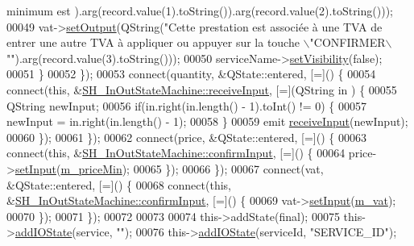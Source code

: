 \begin{DoxyCode}
{{       minimum est %
      ).arg(record.value(1).toString()).arg(record.value(2).toString()));
00049             vat->\hyperlink{classSH__DatabaseContentQuestionState_aaec6c7f8bc78c6beb7447fc41ffe3875}{setOutput}(QString(\textcolor{stringliteral}{"Cette prestation est associée à une TVA de %
       entrer une autre TVA à appliquer ou appuyer sur la touche \(\backslash\)"CONFIRMER\(\backslash\)""}).arg(record.value(3).toString()));
00050             serviceName->\hyperlink{classSH__InOutState_a7fdfaa6f600f0ac4a96f238a038ba9ad}{setVisibility}(\textcolor{keyword}{false});
00051         \}
00052     \});
00053     connect(quantity, &QState::entered, [=]() \{
00054         connect(\textcolor{keyword}{this}, &\hyperlink{classSH__InOutStateMachine_a037ed5e13ecfae2123a8d4940292e410}{SH\_InOutStateMachine::receiveInput}, [=](QString in
      ) \{
00055             QString newInput;
00056             \textcolor{keywordflow}{if}(in.right(in.length() - 1).toInt() != 0) \{
00057                 newInput = in.right(in.length() - 1);
00058             \}
00059             emit \hyperlink{classSH__InOutStateMachine_a037ed5e13ecfae2123a8d4940292e410}{receiveInput}(newInput);
00060         \});
00061     \});
00062     connect(price, &QState::entered, [=]() \{
00063         connect(\textcolor{keyword}{this}, &\hyperlink{classSH__InOutStateMachine_a7f7d9c9300c1d05bce2c26029f28cc31}{SH\_InOutStateMachine::confirmInput}, [=]() \{
00064             price->\hyperlink{classSH__QuestionState_ab40b6202090d1afcc965e124b2deb88a}{setInput}(\hyperlink{classSH__ServiceCharging_a44584a7ff1edd6ae03c4f77544136c13}{m\_priceMin});
00065         \});
00066     \});
00067     connect(vat, &QState::entered, [=]() \{
00068         connect(\textcolor{keyword}{this}, &\hyperlink{classSH__InOutStateMachine_a7f7d9c9300c1d05bce2c26029f28cc31}{SH\_InOutStateMachine::confirmInput}, [=]() \{
00069             vat->\hyperlink{classSH__QuestionState_ab40b6202090d1afcc965e124b2deb88a}{setInput}(\hyperlink{classSH__ServiceCharging_ae2fa75c56883dc4af6b0bbcbb86d0861}{m\_vat});
00070         \});
00071     \});
00072 
00073 
00074     this->addState(\textcolor{keyword}{final});
00075     this->\hyperlink{classSH__InOutStateMachine_a2528cffddbe6f98c32ebef41423c0118}{addIOState}(service, \textcolor{stringliteral}{""});
00076     this->\hyperlink{classSH__InOutStateMachine_a2528cffddbe6f98c32ebef41423c0118}{addIOState}(serviceId, \textcolor{stringliteral}{"SERVICE\_ID"});
}}
\end{DoxyCode}
